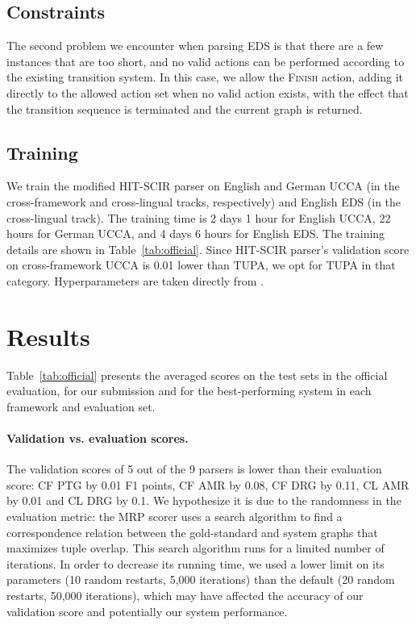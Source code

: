 \documentclass[11pt,a4paper]{article}
\begin{document}
\subsection{Constraints}\label{sec:hit-scir-constraints}
The second problem we encounter when parsing EDS is that there are a few instances that are too short, and no valid actions can be performed according to the existing transition system. In this case, we allow the \textsc{Finish} action, adding it directly to the allowed action set when no valid action exists, with the effect that the transition sequence is terminated and the current graph is returned.

\subsection{Training}\label{sec:hit-scir-training}
We train the modified HIT-SCIR parser on English and German UCCA (in the cross-framework and cross-lingual tracks, respectively) and English EDS (in the cross-lingual track).
The training time is 2 days 1 hour for English UCCA, 22 hours for German UCCA, and 4 days 6 hours for English EDS.
The training details are shown in Table~\ref{tab:official}. Since HIT-SCIR parser's validation score on cross-framework UCCA is 0.01 lower than TUPA, we opt for TUPA in that category.
Hyperparameters are taken directly from .

\section{Results}\label{sec:results}

Table~\ref{tab:official} presents the
averaged scores on the test sets in the official evaluation,
for our submission and for the best-performing system in each framework and evaluation
set. 

\paragraph{Validation vs. evaluation scores.}

The validation scores of 5 out of the 9 parsers is lower than their evaluation score: CF PTG by 0.01 F1 points, CF AMR by 0.08, CF DRG by 0.11, CL AMR by 0.01 and CL DRG by 0.1. We hypothesize it is due to the randomness in the evaluation metric: the MRP scorer uses a search algorithm to find a correspondence relation between the gold-standard and system graphs that maximizes tuple overlap. This search algorithm runs for a limited number of iterations. In order to decrease its running time, we used a lower limit on its parameters (10 random restarts, 5,000 iterations) than the default (20 random restarts, 50,000 iterations), which may have affected the accuracy of our validation score and potentially our system performance.
\end{document}
